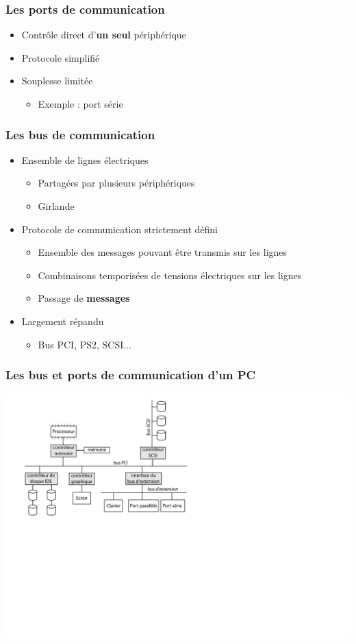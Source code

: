 \begin{frame}
\frametitle{Les ports de communication}
\begin{itemize}
\item Contrôle direct d'\textbf{un seul} périphérique
\item Protocole simplifié
\item Souplesse limitée
\begin{itemize}
\item Exemple : port série
\end{itemize} 
\end{itemize}
\end{frame}

\begin{frame}
\frametitle{Les bus de communication}
\begin{itemize}
\item Ensemble de lignes électriques
\begin{itemize}
\item Partagées par plusieurs périphériques
\item Girlande
\end{itemize}
\item Protocole de communication strictement défini
\begin{itemize}
\item Ensemble des messages pouvant être transmis sur les lignes
\item Combinaisons temporisées de tensions électriques sur les lignes
\item Passage de \textbf{messages}
\end{itemize}
\item Largement répandu
\begin{itemize}
\item Bus PCI, PS2, SCSI...
\end{itemize}
\end{itemize}
\end{frame}

\begin{frame}
\frametitle{Les bus et ports de communication d'un PC}
\includegraphics[width=.8\textwidth]{../illustration/bus_pc.pdf}
\end{frame}

